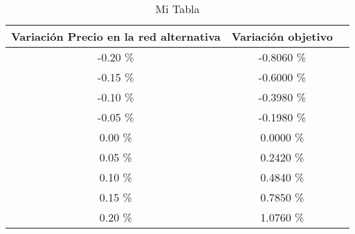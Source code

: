\begin{table}
\centering
\begin{tabular}{|c|c|c|}
\hline
 Variación Precio en la red alternativa & Variación objetivo \\ \hline
-0.20 \% & -0.8060 \% \\ \hline
-0.15 \% & -0.6000 \% \\ \hline
-0.10 \% & -0.3980 \% \\ \hline
-0.05 \% & -0.1980 \% \\ \hline
0.00 \% & 0.0000 \% \\ \hline
0.05 \% & 0.2420 \% \\ \hline
0.10 \% & 0.4840 \% \\ \hline
0.15 \% & 0.7850 \% \\ \hline
0.20 \% & 1.0760 \% \\ \hline
\end{tabular}
\caption{Mi Tabla}
\end{table}

